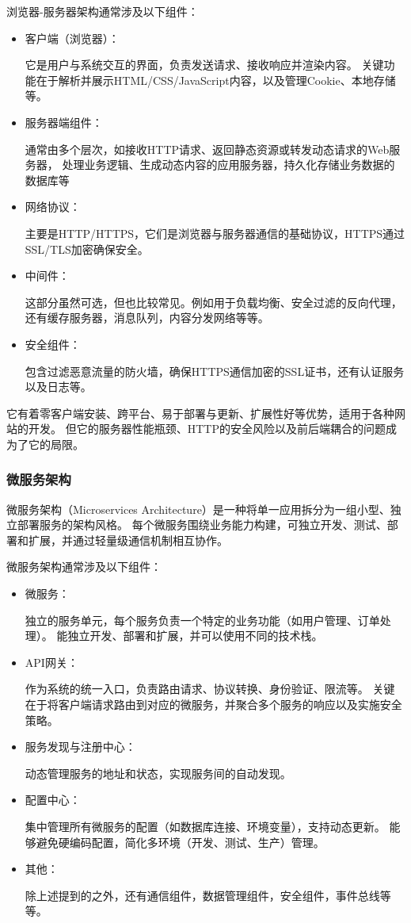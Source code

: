 \documentclass[12pt]{ctexart} %
\begin{document}
浏览器-服务器架构通常涉及以下组件：
\begin{itemize}
  \item 客户端（浏览器）：

  它是用户与系统交互的界面，负责发送请求、接收响应并渲染内容。
  关键功能在于解析并展示HTML/CSS/JavaScript内容，以及管理Cookie、本地存储等。
  \item 服务器端组件：
  
  通常由多个层次，如接收HTTP请求、返回静态资源或转发动态请求的Web服务器，
  处理业务逻辑、生成动态内容的应用服务器，持久化存储业务数据的数据库等
  \item 网络协议：

  主要是HTTP/HTTPS，它们是浏览器与服务器通信的基础协议，HTTPS通过SSL/TLS加密确保安全。
  \item 中间件：

  这部分虽然可选，但也比较常见。例如用于负载均衡、安全过滤的反向代理，还有缓存服务器，消息队列，内容分发网络等等。
  \item 安全组件：

  包含过滤恶意流量的防火墙，确保HTTPS通信加密的SSL证书，还有认证服务以及日志等。
\end{itemize}

它有着零客户端安装、跨平台、易于部署与更新、扩展性好等优势，适用于各种网站的开发。
但它的服务器性能瓶颈、HTTP的安全风险以及前后端耦合的问题成为了它的局限。

\subsubsection{微服务架构}
微服务架构（Microservices Architecture）是一种将单一应用拆分为一组小型、独立部署服务的架构风格。
每个微服务围绕业务能力构建，可独立开发、测试、部署和扩展，并通过轻量级通信机制相互协作。

微服务架构通常涉及以下组件：
\begin{itemize}
  \item 微服务：

  独立的服务单元，每个服务负责一个特定的业务功能（如用户管理、订单处理）。
  能独立开发、部署和扩展，并可以使用不同的技术栈。
  \item API网关：
  
  作为系统的统一入口，负责路由请求、协议转换、身份验证、限流等。
  关键在于将客户端请求路由到对应的微服务，并聚合多个服务的响应以及实施安全策略。
  \item 服务发现与注册中心：

  动态管理服务的地址和状态，实现服务间的自动发现。
  \item 配置中心：

  集中管理所有微服务的配置（如数据库连接、环境变量），支持动态更新。
  能够避免硬编码配置，简化多环境（开发、测试、生产）管理。
  \item 其他：

  除上述提到的之外，还有通信组件，数据管理组件，安全组件，事件总线等等。
\end{itemize}
\end{document}
